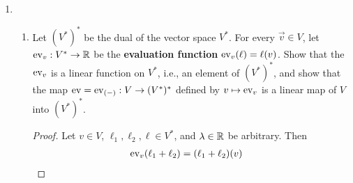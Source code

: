 \documentclass[../psets.tex]{subfiles}
\begin{document}
\begin{enumerate}[label={\textbf{1.2.\roman*.}}]
\begin{enumerate}
\begin{proof}
\begin{align*}
                &= \{(v_1+x_1,v_2)\mid x_1\in\R\}\\
                &= \{(x_1,v_2)\mid x_1\in\R\}
            \end{align*}
            Since every line $x_2=a$ is a set of the form $\{(x_1,a)\mid x_1\in\R\}$, we have that $v+W$ is equal to the line $x_2=v_2$, as desired.
        \end{proof}
        \item Show that the sum of the cosets $x_2=a$ and $x_2=b$ is the coset $x_2=a+b$.
        \begin{proof}
            By part (1), every line $x_2=a$ is a set of the form $(0,a)+W$. Therefore, by the definition of addition on $V/W$,
            \begin{align*}
                [(0,a)+W]+[(0,b)+W] &= [(0,a)+(0,b)]+W\\
                &= (0,a+b)+W
            \end{align*}
            as desired.
        \end{proof}
        \item Show that the scalar multiple of the coset $x_2=c$ by the number $\lambda$ is the coset $x_2=\lambda c$.
        \begin{proof}
            Proceeding in a similar manner to part (2), we have that
            \begin{align*}
                \lambda[(0,c)+W] &= [\lambda(0,c)]+W\\
                &= (0,\lambda c)+W
            \end{align*}
            as desired.
        \end{proof}
    \end{enumerate}
    \item 
    \begin{enumerate}
        \item Let $(V^*)^*$ be the dual of the vector space $V^*$. For every $\vec{v}\in V$, let $\operatorname{ev}_v:V^*\to\mathbb{R}$ be the \textbf{evaluation function} $\operatorname{ev}_v(\ell)=\ell(v)$. Show that the $\operatorname{ev}_v$ is a linear function on $V^*$, i.e., an element of $(V^*)^*$, and show that the map $\operatorname{ev}=\operatorname{ev}_{(-)}:V\to(V^*)^*$ defined by $v\mapsto\operatorname{ev}_v$ is a linear map of $V$ into $(V^*)^*$.
        \begin{proof}
            Let $v\in V$, $\ell_1,\ell_2,\ell\in V^*$, and $\lambda\in\mathbb{R}$ be arbitrary. Then
            \begin{align*}
                \eva_v(\ell_1+\ell_2) &= (\ell_1+\ell_2)(v)&

\end{align*}
\end{proof}
\end{enumerate}
\end{enumerate}
\end{document}
